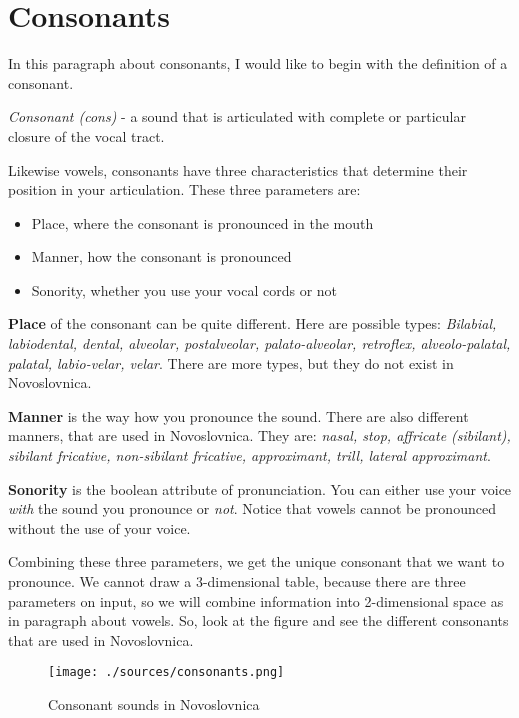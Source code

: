 \section{Consonants}

In this paragraph about consonants, I would like to begin with the definition of a consonant.


\textit{Consonant (\gls{cons})} - a sound that is articulated with complete or particular closure of the vocal tract. 

Likewise vowels, consonants have three characteristics that determine their position in your articulation. These three parameters are:

\begin{itemize}
	\item{Place, where the consonant is pronounced in the mouth}
	\item{Manner, how the consonant is pronounced }
	\item{Sonority, whether you use your vocal cords or not}
\end{itemize}

\textbf{Place} of the consonant can be quite different. Here are possible types: \textit{Bilabial, labiodental, dental, alveolar, postalveolar, palato-alveolar, retroflex, alveolo-palatal, palatal, labio-velar, velar}. There are more types, but they do not exist in Novoslovnica.

\textbf{Manner} is the way how you pronounce the sound. There are also different manners, that are used in Novoslovnica. They are: \textit{nasal, stop, affricate (sibilant), sibilant fricative, non-sibilant fricative, approximant, trill, lateral approximant}.

\textbf{Sonority} is the boolean attribute of pronunciation. You can either use your voice \textit{with} the sound you pronounce or \textit{not}. Notice that vowels cannot be pronounced without the use of your voice. 

Combining these three parameters, we get the unique consonant that we want to pronounce. We cannot draw  a 3-dimensional table, because there are three parameters on input, so we will combine information into 2-dimensional space as in paragraph about vowels. So, look at the figure and see the different consonants that are used in Novoslovnica.

\begin{figure}[h]
	\texttt{[image: ./sources/consonants.png]}
	\caption{Consonant sounds in Novoslovnica}
	\label{fig:consonants}
\end{figure}

